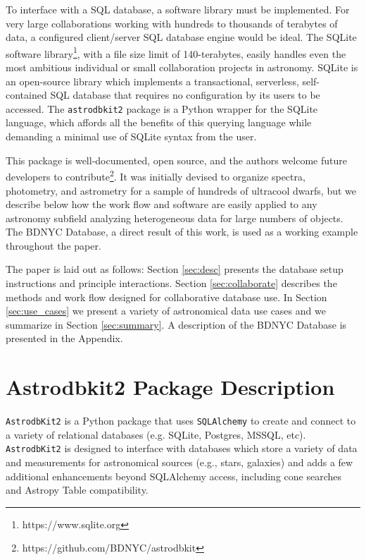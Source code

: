 \documentclass[iop,revtex4,natbib209]{emulateapj}
\begin{document}
To interface with a SQL database, a software library must be implemented. For very large collaborations working with hundreds to thousands of terabytes of data, a configured client/server SQL database engine would be ideal. The SQLite software library\footnote{https://www.sqlite.org}, with a file size limit of 140-terabytes, easily handles even the most ambitious individual or small collaboration projects in astronomy. SQLite is an open-source library which implements a transactional, serverless, self-contained SQL database that requires no configuration by its users to be accessed. The \texttt{astrodbkit2} package is a Python wrapper for the SQLite language, which affords all the benefits of this querying language while demanding a minimal use of  SQLite syntax from the user.

This package is well-documented, open source, and the authors welcome future developers to contribute\footnote{https://github.com/BDNYC/astrodbkit}. It was initially devised to organize spectra, photometry, and astrometry for a sample of hundreds of ultracool dwarfs, but we describe below how the work flow and software are easily applied to any astronomy subfield analyzing heterogeneous data for large numbers of objects. The BDNYC Database, a direct result of this work, is used as a working example throughout the paper.


The paper is laid out as follows: Section \ref{sec:desc} presents the database setup instructions and principle interactions. Section \ref{sec:collaborate} describes the methods and work flow designed for collaborative database use. In Section \ref{sec:use_cases} we present a variety of astronomical data use cases and we summarize in Section \ref{sec:summary}. A description of the BDNYC Database is presented in the Appendix. 

\section{Astrodbkit2 Package Description}{\label{sec:desc}}

\texttt{AstrodbKit2} is a Python package that uses \texttt{SQLAlchemy} to create and connect to a variety of relational databases (e.g. SQLite, Postgres, MSSQL, etc). 
\texttt{AstrodbKit2} is designed to interface with databases which store a variety of data and measurements for astronomical sources (e.g., stars, galaxies) and adds a few additional enhancements beyond SQLAlchemy access, including cone searches and Astropy Table compatibility. 
\end{document}
